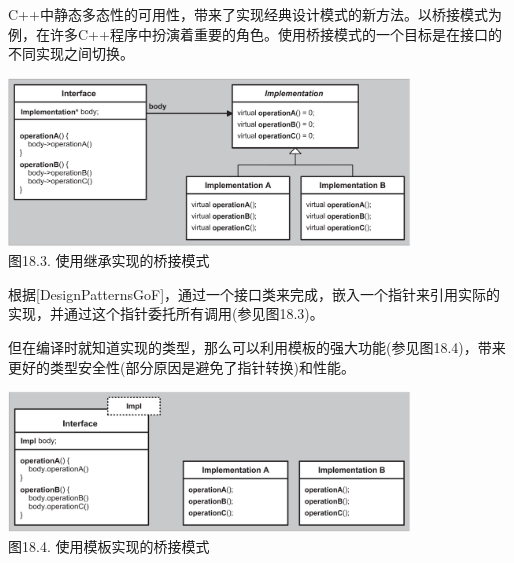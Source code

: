 C++中静态多态性的可用性，带来了实现经典设计模式的新方法。以桥接模式为例，在许多C++程序中扮演着重要的角色。使用桥接模式的一个目标是在接口的不同实现之间切换。

\begin{center}
\includegraphics[width=0.8\textwidth]{content/3/chapter18/images/3.png} \\
图18.3. 使用继承实现的桥接模式
\end{center}

根据[DesignPatternsGoF]，通过一个接口类来完成，嵌入一个指针来引用实际的实现，并通过这个指针委托所有调用(参见图18.3)。

但在编译时就知道实现的类型，那么可以利用模板的强大功能(参见图18.4)，带来更好的类型安全性(部分原因是避免了指针转换)和性能。

\begin{center}
\includegraphics[width=0.8\textwidth]{content/3/chapter18/images/4.png} \\
图18.4. 使用模板实现的桥接模式
\end{center}










































